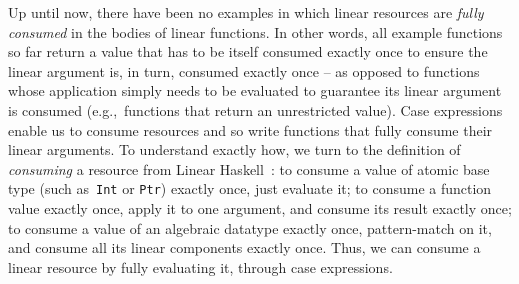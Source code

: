 \documentclass[acmsmall,review,anonymous,screen]{acmart}
\newcommand{\lolli}{\multimap}
\newcommand{\tensor}{\otimes}
\begin{document}
Up until now, there
have been no examples in which linear resources are \emph{fully consumed} in
the bodies of linear functions. In other words, all example functions so far
return a value that has to be itself consumed exactly once to ensure the linear
argument is, in turn, consumed exactly once -- as opposed to functions whose
application simply needs to be evaluated to guarantee its linear argument is
consumed (e.g.,~functions that return an unrestricted value).
%
%
%
%
Case expressions enable us to consume resources and so write
functions that fully consume their linear arguments.
To understand exactly how,
we turn to the definition of \emph{consuming} a resource from Linear
Haskell~\cite{cite:linearhaskell}:
to consume a value of atomic base type (such as~\texttt{Int} or
        \texttt{Ptr}) exactly once, just evaluate it;
        to consume a function value exactly once, apply it to one argument,
        and consume its result exactly once;
        to consume a value of an algebraic datatype exactly once,
        pattern-match on it, and consume all its linear components exactly once.
Thus, we can consume a linear resource by fully evaluating it, through case
expressions.

\end{document}
